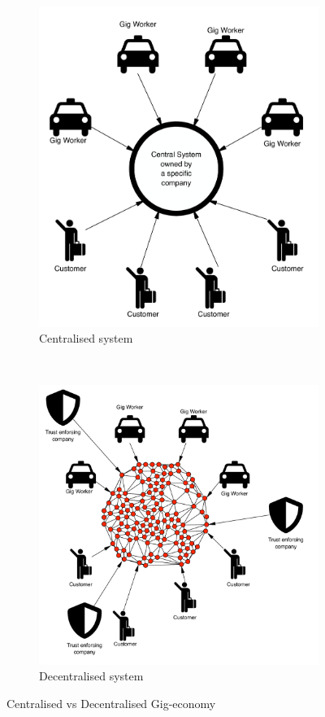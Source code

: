\documentclass{article}
\begin{document}
\begin{figure}[t!]
    \centering
    \begin{subfigure}[t]{0.4\textwidth}
        \centering
        \includegraphics[scale=0.25]{centralised.pdf}
        \caption{Centralised system}
    \end{subfigure}%
    ~ 
    \begin{subfigure}[t]{0.4\textwidth}
        \centering
        \includegraphics[scale=0.25]{decentralised.pdf}
        \caption{Decentralised system}
    \end{subfigure}
    \caption{Centralised vs Decentralised Gig-economy}
\end{figure}
\end{document}
